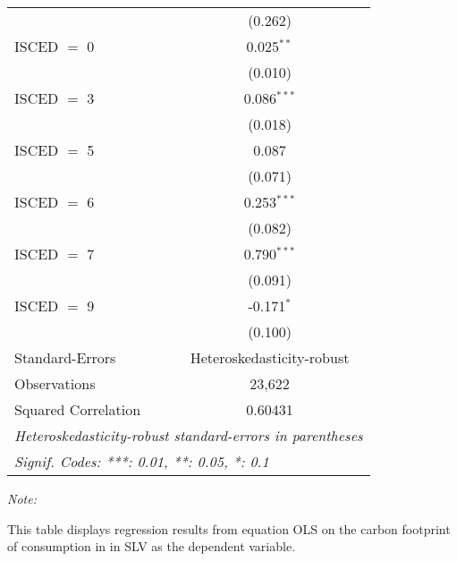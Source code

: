 \begin{table}[htbp!]
\begin{adjustbox}{width = 1\textwidth, max height = 0.95\textheight, center}
\begin{threeparttable}[b]
\begin{tabular}{lc}
                                & (0.262)\\   
            ISCED $=$ 0         & 0.025$^{**}$\\   
                                & (0.010)\\   
            ISCED $=$ 3         & 0.086$^{***}$\\   
                                & (0.018)\\   
            ISCED $=$ 5         & 0.087\\   
                                & (0.071)\\   
            ISCED $=$ 6         & 0.253$^{***}$\\   
                                & (0.082)\\   
            ISCED $=$ 7         & 0.790$^{***}$\\   
                                & (0.091)\\   
            ISCED $=$ 9         & -0.171$^{*}$\\   
                                & (0.100)\\   
            \midrule 
            Standard-Errors     & Heteroskedasticity-robust \\   
            Observations        & 23,622\\  
            Squared Correlation & 0.60431\\  
            \midrule \midrule
            \multicolumn{2}{l}{\emph{Heteroskedasticity-robust standard-errors in parentheses}}\\
            \multicolumn{2}{l}{\emph{Signif. Codes: ***: 0.01, **: 0.05, *: 0.1}}\\
         \end{tabular}
         
         \begin{tablenotes}\item \medskip \textit{Note:}
            \item This table displays regression results from equation OLS on the carbon footprint of consumption in  in SLV as the dependent variable.  
         \end{tablenotes}
      \end{threeparttable}
   \end{adjustbox}
\end{table}


